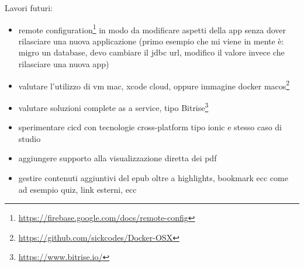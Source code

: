 
Lavori futuri: 
\begin{itemize}
    \item remote configuration\footnote{\url{https://firebase.google.com/docs/remote-config}} in modo da modificare aspetti della app senza dover rilasciare una nuova applicazione (primo esempio che mi viene in mente è: migro un database, devo cambiare il jdbc url, modifico il valore invece che rilasciare una nuova app)
    \item valutare l'utilizzo di vm mac, xcode cloud, oppure immagine docker macos\footnote{\url{https://github.com/sickcodes/Docker-OSX}}
    \item valutare soluzioni complete as a service, tipo Bitrise\footnote{\url{https://www.bitrise.io/}}
    \item sperimentare cicd con tecnologie cross-platform tipo ionic e stesso caso di studio
    \item aggiungere supporto alla visualizzazione diretta dei pdf
    \item gestire contenuti aggiuntivi del epub oltre a highlights, bookmark ecc come ad esempio quiz, link esterni, ecc
\end{itemize}
